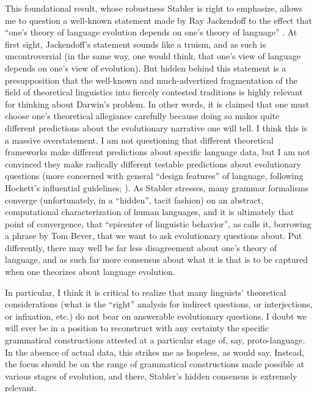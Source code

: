This foundational result, whose robustness Stabler is right to emphasize, allows me to question a well-known statement made by Ray Jackendoff to the effect that ``one's theory of language evolution depends on one's theory of language'' \citep{jackendoff2010your}. At first sight, Jackendoff's statement sounds like a truism, and as such is uncontroversial (in the same way, one would think, that one's view of language depends on one's view of evolution). But hidden behind this statement is a presupposition that the well-known and much-advertized fragmentation of the field of theoretical linguistics into fiercely contested traditions is highly relevant for thinking about Darwin's problem. In other words, it is claimed that one must choose one's theoretical allegiance carefully because doing so makes quite different predictions about the evolutionary narrative one will tell. I think this is a massive overstatement. I am not questioning that different theoretical frameworks make different predictions about specific language data, but I am not convinced they make radically different testable predictions about evolutionary questions (more concerned with general ``design features'' of language, following Hockett's influential guidelines; \cite{hockett1960origin}). As Stabler stresses, many grammar formalisms converge (unfortunately, in a ``hidden'', tacit fashion) on an abstract, computational characterization of human languages, and it is ultimately that point of convergence, that ``epicenter of linguistic behavior'', as \cite{stabler2013epicenter} calls it, borrowing a phrase by Tom Bever, that we want to ask evolutionary questions about. Put differently, there may well be far less disagreement about one's theory of language, and as such far more consensus about what it is that is to be captured when one theorizes about language evolution.

In particular, I think it is critical to realize that many linguists' theoretical considerations (what is the ``right'' analysis for indirect questions, or interjections, or infixation, etc.) do not bear on answerable evolutionary questions. I doubt we will ever be in a position to reconstruct with any certainty the specific grammatical constructions attested at a particular stage of, say, proto-language. In the absence of actual data, this strikes me as hopeless, as \cite{lewontin1998evolution} would say. Instead, the focus should be on the range of grammatical constructions made possible at various stages of evolution, and there, Stabler's hidden consensus is extremely relevant.

